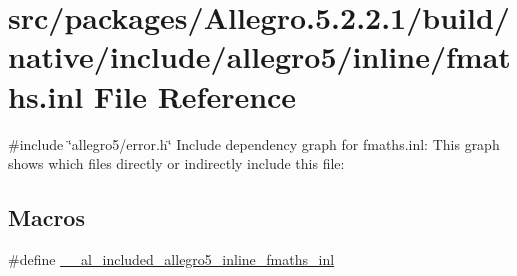 \hypertarget{fmaths_8inl}{}\section{src/packages/\+Allegro.5.2.2.1/build/native/include/allegro5/inline/fmaths.inl File Reference}
\label{fmaths_8inl}
{\ttfamily \#include \char`\"{}allegro5/error.\+h\char`\"{}}\newline
Include dependency graph for fmaths.\+inl\+:
This graph shows which files directly or indirectly include this file\+:
\subsection*{Macros}
\begin{DoxyCompactItemize}
\item 
\#define \hyperlink{fmaths_8inl_a68082877191ea8b13e84fc7c1bac9c7d}{\+\_\+\+\_\+al\+\_\+included\+\_\+allegro5\+\_\+inline\+\_\+fmaths\+\_\+inl}
\end{DoxyCompactItemize}
